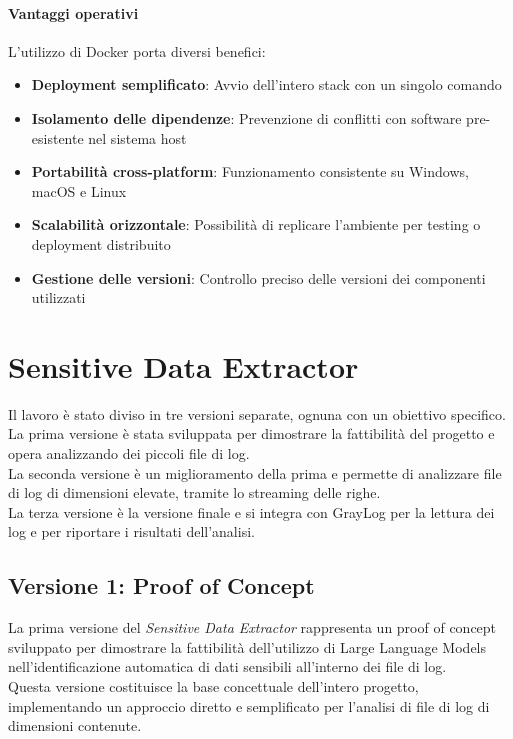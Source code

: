 \documentclass[12pt]{report}
\begin{document}
\subsubsection{Vantaggi operativi}
L'utilizzo di Docker porta diversi benefici:

\begin{itemize}
    \item \textbf{Deployment semplificato}: Avvio dell'intero stack con un singolo comando
    \item \textbf{Isolamento delle dipendenze}: Prevenzione di conflitti con software pre-esistente nel sistema host
    \item \textbf{Portabilità cross-platform}: Funzionamento consistente su Windows, macOS e Linux
    \item \textbf{Scalabilità orizzontale}: Possibilità di replicare l'ambiente per testing o deployment distribuito
    \item \textbf{Gestione delle versioni}: Controllo preciso delle versioni dei componenti utilizzati
\end{itemize}



%
%

\chapter{Sensitive Data Extractor}
\label{chap:sensitive_data_extractor}

Il lavoro è stato diviso in tre versioni separate, ognuna con un obiettivo specifico. \\
La prima versione è stata sviluppata per dimostrare la fattibilità del progetto e opera analizzando dei piccoli file di log. \\
La seconda versione è un miglioramento della prima e permette di analizzare file di log di dimensioni elevate, tramite lo streaming delle righe. \\
La terza versione è la versione finale e si integra con GrayLog per la lettura dei log e per riportare i risultati dell'analisi.

\section{Versione 1: Proof of Concept}
\label{sec:ver1}

La prima versione del \textit{Sensitive Data Extractor} rappresenta un proof of concept sviluppato per dimostrare la fattibilità dell'utilizzo di Large Language Models nell'identificazione automatica di dati sensibili all'interno dei file di log. \\
Questa versione costituisce la base concettuale dell'intero progetto, implementando un approccio diretto e semplificato per l'analisi di file di log di dimensioni contenute.
\end{document}
